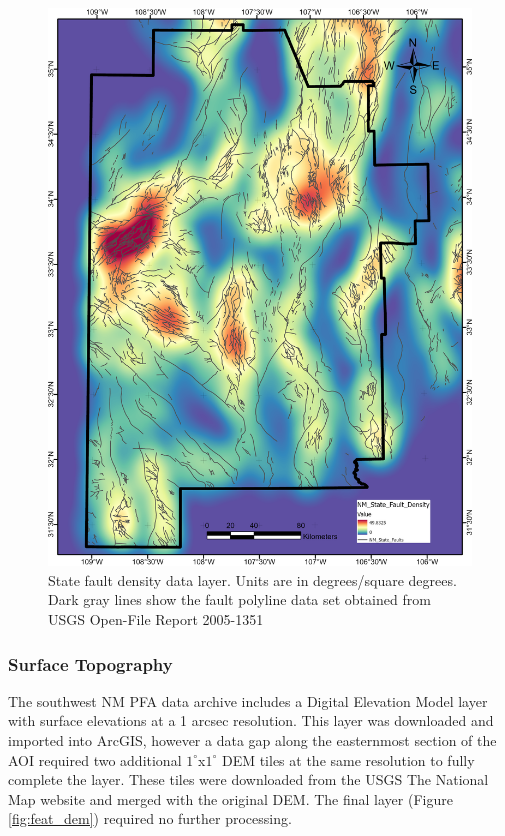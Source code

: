 \begin{figure}[!htp]
\centering
\includegraphics[scale=.50]{templates/images/Figure-StateFaultDensity.png}
\caption[State fault density data layer]{State fault density data layer. Units are in degrees/square degrees. Dark gray lines show the fault polyline data set obtained from USGS Open-File Report 2005-1351 \protect\citep{stoeser_new_2005}}
\label{fig:state_faults}
\end{figure}

\subsubsection{Surface Topography}

The southwest NM PFA data archive \citep{kelley_geothermal_2015} includes a Digital Elevation Model layer with surface elevations at a 1 arcsec resolution. This layer was downloaded and imported into ArcGIS, however a data gap along the easternmost section of the AOI required two additional $1^\circ$x$1^\circ$ DEM tiles at the same resolution to fully complete the layer. These tiles were downloaded from the USGS The National Map website \citep{usgs_tnm_2021} and merged with the original DEM. The final layer (Figure \ref{fig:feat_dem}) required no further processing.

